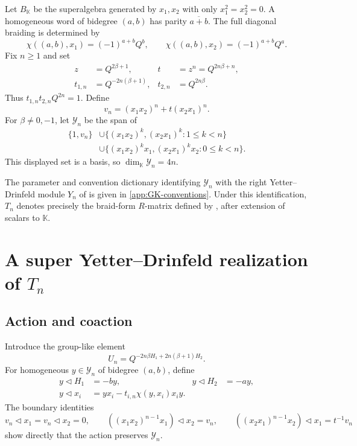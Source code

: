 \documentclass[11pt,a4paper]{article}
\newcommand{\hK}{\mathbb K}
\newcommand{\tri}{\mathbin{\triangleleft}}
\theoremstyle{definition}
\theoremstyle{remark}
\begin{document}
Let \(B_{\hK}\) be the superalgebra generated by \(x_1,x_2\) with only
\(x_1^2=x_2^2=0\).  A homogeneous word of bidegree \((a,b)\) has parity
\(\overline{a+b}\).  The full diagonal braiding is determined by
\begin{equation}\label{eq:chi}
 \chi((a,b),x_1)=(-1)^{a+b}Q^b,\qquad
 \chi((a,b),x_2)=(-1)^{a+b}Q^a.
\end{equation}
Fix \(n\geq1\) and set
\begin{equation}\label{eq:parameters}
\begin{aligned}
 z&=Q^{2\beta+1},&
 t&=z^n=Q^{2n\beta+n},\\
 t_{1,n}&=Q^{-2n(\beta+1)},&
 t_{2,n}&=Q^{2n\beta}.
\end{aligned}
\end{equation}
Thus \(t_{1,n}t_{2,n}Q^{2n}=1\).  Define
\[
 v_n=(x_1x_2)^n+t(x_2x_1)^n.
\]
For \(\beta\neq0,-1\), let \(\mathcal Y_n\) be the span of
\begin{equation}\label{eq:Yn-basis}
\begin{split}
 \{1,v_n\}
 &\cup\{(x_1x_2)^k,(x_2x_1)^k:1\leq k<n\}\\
 &\cup\{(x_1x_2)^kx_1,(x_2x_1)^kx_2:0\leq k<n\}.
\end{split}
\end{equation}
This displayed set is a basis, so \(\dim_{\hK}\mathcal Y_n=4n\).

The parameter and convention dictionary identifying \(\mathcal Y_n\) with
the right Yetter--Drinfeld module \(Y_n\) of
\cite[Proposition~7.4]{GK} is given in
\cref{app:GK-conventions}.  Under this identification, \(T_n\) denotes
precisely the braid-form \(R\)-matrix defined by
\cite[Theorem~3.6 and Definition~7.5]{GK}, after extension of scalars to
\(\hK\).

\section[A super Yetter--Drinfeld realization of Tn]
{A super Yetter--Drinfeld realization of \(T_n\)}
\label{sec:yd}

\subsection{Action and coaction}

Introduce the group-like element
\begin{equation}\label{eq:Un}
 U_n=Q^{-2n\beta H_1+2n(\beta+1)H_2}.
\end{equation}
For homogeneous \(y\in\mathcal Y_n\) of bidegree \((a,b)\), define
\begin{equation}\label{eq:Yn-action}
\begin{aligned}
 y\tri H_1&=-by,& y\tri H_2&=-ay,\\
 y\tri x_i&=yx_i-t_{i,n}\chi(y,x_i)x_i y.
\end{aligned}
\end{equation}
The boundary identities
\[
 v_n\tri x_1=v_n\tri x_2=0,\qquad
 ((x_1x_2)^{n-1}x_1)\tri x_2=v_n,\qquad
 ((x_2x_1)^{n-1}x_2)\tri x_1=t^{-1}v_n
\]
show directly that the action preserves \(\mathcal Y_n\).
\end{document}
